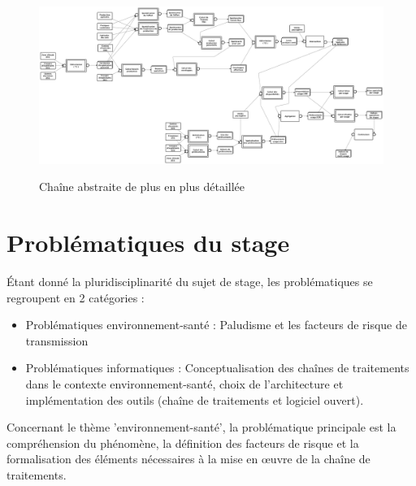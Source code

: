 \begin{landscape}
\begin{figure}[h] \centering
\includegraphics[width=23cm]{traitementsSiel4.png}\\
\caption{\label{SIEL4} Chaîne abstraite de plus en plus détaillée}
\end{figure}
\end{landscape}





\newpage
\section{Problématiques du stage}


Étant donné la pluridisciplinarité du sujet de stage, les problématiques se regroupent en 2 catégories :\\
\begin{itemize}
\item Problématiques environnement-santé : Paludisme et les facteurs de risque de transmission
\item Problématiques informatiques : Conceptualisation des chaînes de traitements dans le contexte environnement-santé, choix de l'architecture et implémentation des outils (chaîne de traitements et logiciel ouvert).\\
\end{itemize}


Concernant le thème 'environnement-santé', la problématique principale est la compréhension du phénomène, la définition des facteurs de risque et la formalisation des éléments nécessaires à la mise en œuvre de la chaîne de traitements.\\

